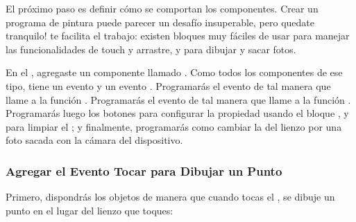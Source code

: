 El próximo paso es definir cómo se comportan los componentes. Crear un
programa de pintura puede parecer un desafío insuperable, pero quedate
tranquilo! \AppInventor te facilita el trabajo: existen bloques muy
fáciles de usar para manejar las funcionalidades de touch y arrastre,
y para dibujar y sacar fotos.

En el \designer, agregaste un componente  llamado
. Como todos los componentes de ese tipo,
 tiene un evento  y un evento
. Programarás el evento 
de tal manera que llame a la función
. Programarás el evento
 de tal manera que llame a la función
. Programarás luego los botones para
configurar la propiedad  usando el bloque
, y para limpiar el
; y finalmente, programarás como cambiar la
 del lienzo por una foto sacada con la cámara
del dispositivo.

\subsubsection*{Agregar el Evento Tocar para Dibujar un Punto}

Primero, dispondrás los objetos de manera que cuando tocas el
, se dibuje un punto en el lugar del lienzo que
toques:
	

